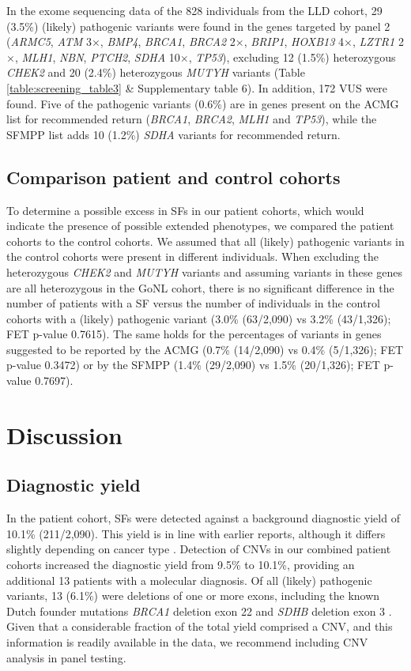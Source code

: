 In the exome sequencing data of the 828 individuals from the LLD cohort, 29 (3.5\%) (likely) pathogenic variants were found in the genes targeted by panel 2 (\textsl{ARMC5}, \textsl{ATM} 3$\times$, \textsl{BMP4}, \textsl{BRCA1}, \textsl{BRCA2} 2$\times$, \textsl{BRIP1}, \textsl{HOXB13} 4$\times$, \textsl{LZTR1} 2$\times$, \textsl{MLH1}, \textsl{NBN}, \textsl{PTCH2}, \textsl{SDHA} 10$\times$, \textsl{TP53}), excluding 12 (1.5\%) heterozygous \textsl{CHEK2} and 20 (2.4\%) heterozygous \textsl{MUTYH} variants (Table \ref{table:screening_table3} \& Supplementary table 6).  %
In addition, 172 VUS were found. Five of the pathogenic variants (0.6\%) are in genes present on the ACMG list for recommended return (\textsl{BRCA1}, \textsl{BRCA2}, \textsl{MLH1} and \textsl{TP53}), while the SFMPP list adds 10 (1.2\%) \textsl{SDHA} variants for recommended return.

\subsection{Comparison patient and control cohorts}
To determine a possible excess in SFs in our patient cohorts, which would indicate the presence of possible extended phenotypes, we compared the patient cohorts to the control cohorts. 
We assumed that all (likely) pathogenic variants in the control cohorts were present in different individuals. When excluding the heterozygous \textsl{CHEK2} and \textsl{MUTYH} variants and assuming variants in these genes are all heterozygous in the GoNL cohort, there is no significant difference in the number of patients with a SF versus the number of individuals in the control cohorts with a (likely) pathogenic variant (3.0\% (63/2,090) vs 3.2\% (43/1,326); FET p-value 0.7615). 
The same holds for the percentages of variants in genes suggested to be reported by the ACMG (0.7\% (14/2,090) vs 0.4\% (5/1,326); FET p-value 0.3472) or by the SFMPP (1.4\% (29/2,090) vs 1.5\% (20/1,326); FET p-value 0.7697).

\section{Discussion}
\subsection{Diagnostic yield}
In the patient cohort, SFs were detected against a background diagnostic yield of 10.1\% (211/2,090). 
This yield is in line with earlier reports, although it differs slightly depending on cancer type \cite{Hu_2018,Susswein_2015,Yurgelun_2017}. 
Detection of CNVs in our combined patient cohorts increased the diagnostic yield from 9.5\% to 10.1\%, providing an additional 13 patients with a molecular diagnosis. 
Of all (likely) pathogenic variants, 13 (6.1\%) were deletions of one or more exons, including the known Dutch founder mutations \textsl{BRCA1} deletion exon 22 and \textsl{SDHB} deletion exon 3 \cite{Petrij_Bosch_1997,Bayley_2009}. 
Given that a considerable fraction of the total yield comprised a CNV, and this information is readily available in the data, we recommend including CNV analysis in panel testing. 

